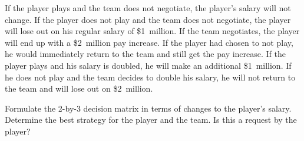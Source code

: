   If the player plays and the team does not negotiate, the player's salary will not change. 
  If the player does not play and the team does not negotiate, the player will lose out on his regular salary of \$1\ million.
  If the team negotiates, the player will end up with a \$2\ million pay increase. If the player had chosen to not play, he would immediately return to the team and still get the pay increase.
  If the player plays and his salary is doubled, he will make an additional \$1\ million. If he does not play and the team decides to double his salary, he will not return to the team and will lose out on \$2\ million. 
  
  Formulate the 2-by-3 decision matrix in terms of changes to the player's salary. 
  Determine the best strategy for the player and the team. 
  Is this a request by the player?
  
